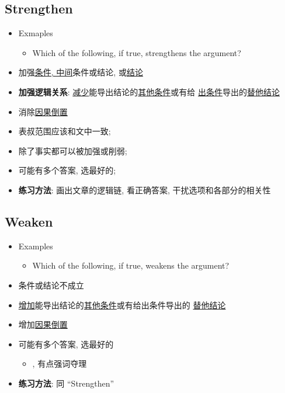   \subsection{Strengthen}

    \begin{itemize}
      \item Exmaples
      \begin{itemize}
        \item Which of the following, if true, strengthens the argument?
      \end{itemize}

      \item 加强\uline{条件, 中间}条件或结论, 或\uline{结论}
      \item \textbf{加强逻辑关系}: \uline{减少}能导出结论的\uline{其他条件}或有给
      \uline{出条件}导出的\uline{替他结论}
      \item 消除\uline{因果倒置}
      \item 表叔范围应该和文中一致;
      \item 除了事实都可以被加强或削弱;
      \item 可能有多个答案, 选最好的;
      \item \textbf{练习方法}: 画出文章的逻辑链, 看正确答案, 干扰选项和各部分的相关性
    \end{itemize}

  \subsection{Weaken}

    \begin{itemize}
      \item Examples
      \begin{itemize}
        \item Which of the following, if true, weakens the argument?
      \end{itemize}

      \item 条件或结论不成立
      \item \uline{增加}能导出结论的\uline{其他条件}或有给出条件导出的
      \uline{替他结论}
      \item 增加\uline{因果倒置}
      \item 可能有多个答案, 选最好的
      \begin{itemize}
        \item {}, 有点强词夺理
      \end{itemize}
      \item \textbf{练习方法}: 同 “Strengthen”
    \end{itemize}

